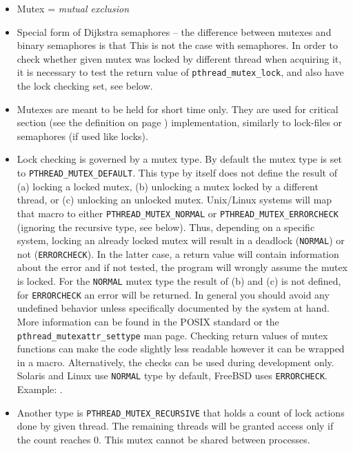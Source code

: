 \begin{itemize}
\item Mutex = \emph{mutual exclusion}
\item Special form of Dijkstra semaphores -- the difference between mutexes and
binary semaphores is that  This is not the case with
semaphores. In order to check whether given mutex was locked by different thread
when acquiring it, it is necessary to test the return value of
\texttt{p\-thread\_mutex\_lock}, and also have the lock checking set, see below.
\item Mutexes are meant to be held for short time only. They are used for
critical section (see the definition on page \pageref{CRITICALSECTION})
implementation, similarly to lock-files or semaphores (if used like locks).
\item Lock checking is governed by a mutex type.  By default the mutex type is
set to \texttt{PTHREAD\_MUTEX\_DEF\-AULT}.  This type by itself does not define
the result of (a) locking a locked mutex, (b) unlocking a mutex locked by a
different thread, or (c) unlocking an unlocked mutex.  Unix/Linux systems will
map that macro to either \texttt{PTHREAD\_MUTEX\_NORMAL} or
\texttt{PTHREAD\_\-MUT\-EX\_ERRORCHECK} (ignoring the recursive type, see
below).  Thus, depending on a specific system, locking an already locked mutex
will result in a deadlock (\texttt{NORMAL}) or not (\texttt{ERRORCHECK}).  In
the latter case, a return value will contain information about the error and if
not tested, the program will wrongly assume the mutex is locked.  For the
\texttt{NORMAL} mutex type the result of (b) and (c) is not
defined, for \texttt{ERRORCHECK} an error will be returned.
In general you should avoid any undefined behavior unless specifically
documented by the system at hand.  More information can be found in the POSIX
standard or the \texttt{pth\-read\_mutex\-attr\_set\-ty\-pe} man page.  Checking
return values of mutex functions can make the code slightly less readable
however it can be wrapped in a macro. Alternatively, the checks can be used
during development only.  Solaris and Linux use \texttt{NORMAL} type by default,
FreeBSD uses \texttt{ERRORCHECK}.  
Example: .
\item Another type is \texttt{PTHREAD\_MUTEX\_RECURSIVE} that holds a count of
lock actions done by given thread. The remaining threads will be granted access
only if the count reaches 0. This mutex cannot be shared between processes.

\end{itemize}
